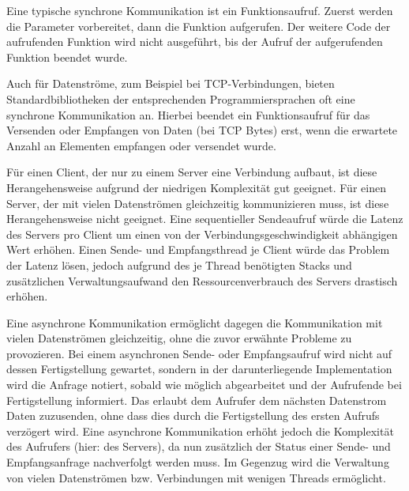 Eine typische synchrone Kommunikation ist ein Funktionsaufruf.
Zuerst werden die Parameter vorbereitet, dann die Funktion aufgerufen.
Der weitere Code der aufrufenden Funktion wird nicht ausgeführt, bis der Aufruf der aufgerufenden Funktion beendet wurde.

Auch für Datenströme, zum Beispiel bei TCP-Verbindungen, bieten Standardbibliotheken der entsprechenden Programmiersprachen oft eine synchrone Kommunikation an.
Hierbei beendet ein Funktionsaufruf für das Versenden oder Empfangen von Daten (bei TCP Bytes) erst, wenn die erwartete Anzahl an Elementen empfangen oder versendet wurde.

Für einen Client, der nur zu einem Server eine Verbindung aufbaut, ist diese Herangehensweise aufgrund der niedrigen Komplexität gut geeignet.
Für einen Server, der mit vielen Datenströmen gleichzeitig kommunizieren muss, ist diese Herangehensweise nicht geeignet.
Eine sequentieller Sendeaufruf würde die Latenz des Servers pro Client um einen von der Verbindungsgeschwindigkeit abhängigen Wert erhöhen.
Einen Sende- und Empfangsthread je Client würde das Problem der Latenz lösen, jedoch aufgrund des je Thread benötigten Stacks und zusätzlichen Verwaltungsaufwand den Ressourcenverbrauch des Servers drastisch erhöhen.

Eine asynchrone Kommunikation ermöglicht dagegen die Kommunikation mit vielen Datenströmen gleichzeitig, ohne die zuvor erwähnte Probleme zu provozieren.
Bei einem asynchronen Sende- oder Empfangsaufruf wird nicht auf dessen Fertigstellung gewartet, sondern in der darunterliegende Implementation wird die Anfrage notiert, sobald wie möglich abgearbeitet und der Aufrufende bei Fertigstellung informiert.
Das erlaubt dem Aufrufer dem nächsten Datenstrom Daten zuzusenden, ohne dass dies durch die Fertigstellung des ersten Aufrufs verzögert wird.
Eine asynchrone Kommunikation erhöht jedoch die Komplexität des Aufrufers (hier: des Servers), da nun zusätzlich der Status einer Sende- und Empfangsanfrage nachverfolgt werden muss.
Im Gegenzug wird die Verwaltung von vielen Datenströmen bzw. Verbindungen mit wenigen Threads ermöglicht.


